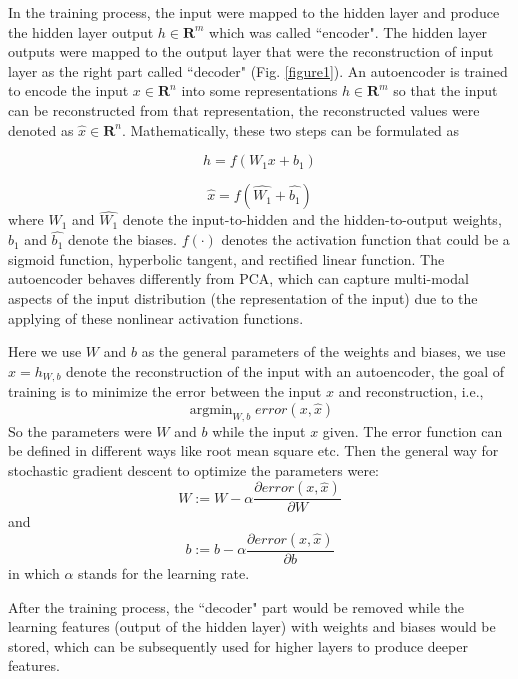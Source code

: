 \documentclass[journal]{IEEEtran}
\DeclareMathOperator*{\argmin}{argmin}
\begin{document}
In the training process, the input were mapped to the hidden layer and produce the hidden layer output $h\in{\mathbf{R}^m}$ which was called ``encoder". The hidden layer outputs were mapped to the output layer that were the reconstruction of input layer as the right part called ``decoder" (Fig. \ref{figure1}). An autoencoder is trained to encode the input $x\in{\mathbf{R}^n}$ into some representations $h\in{\mathbf{R}^m}$ so that the input can be reconstructed from that representation\cite{bengio2009}, the reconstructed values were denoted as $\hat{x}\in{\mathbf{R}^n}$. Mathematically, these two steps can be formulated as

\begin{equation}
h = f(W_{1}x+b_{1})
\end{equation}

\begin{equation}
\hat{x}= f(\hat{W_{1}} + \hat{b_{1}})
\end{equation}
where $W_1$ and $\hat{W_1}$ denote the input-to-hidden and the hidden-to-output weights, $b_1$ and $\hat{b_1}$ denote the biases. $f(\cdot)$ denotes the activation function that could be a sigmoid function, hyperbolic tangent, and rectified linear function. The autoencoder behaves differently from PCA, which can capture multi-modal aspects of the input distribution (the representation of the input) \cite{jap} due to the applying of these nonlinear activation functions.

Here we use $W$ and $b$ as the general parameters of the weights and biases, we use  $\hat{x}=h_{W,b}$ denote the reconstruction of the input with an autoencoder, the goal of training is to minimize the error between the input $x$ and reconstruction, i.e.,
\begin{equation}
 \mathop{\argmin}_{W,b}{error(x,\hat{x})}
\end{equation}
So the parameters were $W$ and $b$ while the input $x$  given. The error function can be defined in different ways like root mean square etc. Then the general way for stochastic gradient descent to optimize the parameters were:
\begin{equation}
W := W - \alpha \frac{\partial error(x, \hat{x})}{\partial W}
\end{equation}
and
\begin{equation}
b := b - \alpha \frac{\partial error(x, \hat{x})}{\partial b}
\end{equation}
in which $\alpha $ stands for the learning rate. 

After the training process, the ``decoder" part would be removed while the learning features (output of the hidden layer) with weights and biases would be stored, which can be subsequently used for higher layers to produce deeper features.
\end{document}
